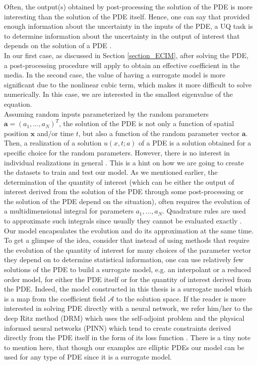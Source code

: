 Often, the output(s) obtained by post-processing the solution of the PDE is more interesting than the solution of the PDE itself. Hence, one can say that provided enough information about the uncertainty in the inputs of the PDE, a UQ task is to determine information about the uncertainty in the output of interest that depends on the solution of a PDE \cite{UQIntroGunzburger}.\\
In our first case, as discussed in Section \eqref{section_ECIM}, after solving the PDE, a post-processing procedure will apply to obtain an effective coefficient in the media. In the second case, the value of having a surrogate model is more significant due to the nonlinear cubic term, which makes it more difficult to solve numerically. In this case, we are interested in the smallest eigenvalue of the equation.\\
Assuming random inputs parameterized by the random parameters $\bm{a} = (a_1,\dots,a_N)^T$, the solution of the PDE is not only a function of spatial position $\bm{x}$ and/or time $t$, but also a function of the random parameter vector $\bm{a}$. Then, a realization of a solution $u(x,t; a)$ of a PDE is a solution obtained for a specific choice for the random parameters. However, there is no interest in individual realizations in general \cite{UQIntroGunzburger}. This is a hint on how we are going to create the datasets to train and test our model. As we mentioned earlier, the determination of the quantity of interest (which can be either the output of interest derived from the solution of the PDE through some post-processing or the solution of the PDE depend on the situation), often requires the evolution of a multidimensional integral for parameters $a_1,\dots,a_N$. Quadrature rules are used to approximate such integrals since usually they cannot be evaluated exactly \cite{UQIntroGunzburger}. Our model encapsulates the evolution and do its approximation at the same time. To get a glimpse of the idea, consider that instead of using methods that require the evolution of the quantity of interest for many choices of the parameter vector they depend on to determine statistical information, one can use relatively few solutions of the PDE to build a surrogate model, e.g. an interpolant or a reduced order model, for either the PDE itself or for the quantity of interest derived from the PDE. Indeed, the model constructed in this thesis is a surrogate model which is a map from the coefficient field $\mathscr{A}$ to the solution space. If the reader is more interested in solving PDE directly with a neural network, we refer him/her to the deep Ritz method (DRM) which uses the self-adjoint problem \cite{weinan2018deep} and the physical informed neural networks (PINN) which tend to create constraints derived directly from the PDE itself in the form of its loss function \cite{raissi2017physics,raissi2018deep}.
There is a tiny note to mention here, that though our examples are elliptic PDEs our model can be used for any type of PDE since it is a surrogate model.
